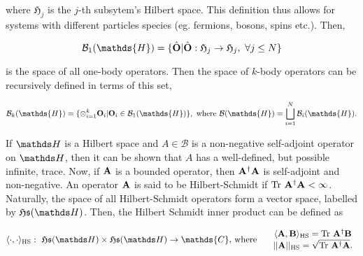 \documentclass{homework}
\begin{document}
where $\mathfrak{H}_j$ is the $j$-th subsytem's Hilbert space. This definition thus allows for systems with different particles species (eg. fermions, bosons, spins etc.). Then, 

$$
\mathcal{B}_1(\mathds{H})=\{\hat{\bf O}| \hat{\bf O}:\mathfrak{H}_j \rightarrow \mathfrak{H}_j, \blanky \forall j \leq N \}
$$ 

is the space of all one-body operators. Then the
space of $k$-body operators can be recursively defined in terms of this set, 

\begin{align*}
\mathcal{B}_k(\mathds{H}) = \{\otimes_{i=1}^{k} {\bf O}_i | {\bf O}_i \in \mathcal{B}_1(\mathds{H}) \}, \textnormal{ where } \mathcal{B}(\mathds{H}) = \bigsqcup_{i=1}^{N} \mathcal{B}_i(\mathds{H}).
\end{align*}


If $\hilbert$ is a Hilbert space and $A \in \mathcal{B}$ is a non-negative self-adjoint operator on $\hilbert$, then it can be shown that $A$ has a well-defined, but possible infinite, trace. Now, if ${\bf A}$ is a bounded operator, then ${\bf A}^\dagger {\bf A}$ is self-adjoint and non-negative. An operator ${\bf A}$ is said to be Hilbert-Schmidt if $\textnormal{Tr } \bf A^\dagger {\bf A} < \infty$. Naturally, the space of all Hilbert-Schmidt operators form a vector space, labelled by $\mathfrak{H}\mathfrak{s}(\hilbert)$. Then, the Hilbert Schmidt inner product can be defined as 

\begin{align*}
\langle \cdot , \cdot \rangle_{\textnormal{HS}}: \blanky \mathfrak{H}\mathfrak{s}(\hilbert) \times \mathfrak{H}\mathfrak{s}(\hilbert) \rightarrow \mathds{C}, & \textnormal{ where } &
    \begin{array}{c} 
         \langle {\bf A}, {\bf B} \rangle_{\textnormal{HS}} = \textnormal{Tr } \bf A^\dagger {\bf B} \\
         ||{\bf A}||_{\textnormal{HS}} = \sqrt{\textnormal{Tr } \bf A^\dagger {\bf A}}.
    \end{array}
\end{align*}
\end{document}
